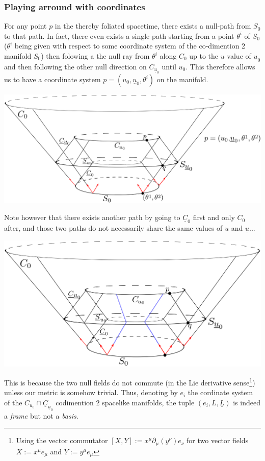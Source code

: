 \documentclass[a4paper,11pt]{article}
\numberwithin{equation}{section}
\theoremstyle{definition}
\begin{document}
\subsubsection{Playing arround with coordinates}
For any point $p$ in the thereby foliated spacetime, there exists a null-path from $S_0$ to that path. In fact, there even exists a single path starting from a point $\theta^i$ of $S_0$ ($\theta^i$ being given with respect to some coordinate system of the co-dimention 2 manifold $S_0$) then folowing a the null ray from $\theta^i$ along $C_0$ up to the $\underline{u}$ value of $\underline{u}_0$ and then following the other null direction on $C_{\underline{u}_0}$ until $u_0$. This therefore allows us to have a coordinate system $p=(u_0, \underline{u}_0, \theta^i)$ on the manifold.
\begin{center}
    \includegraphics [width=0.75\linewidth] {Pictures/04_Coordinates.png}
\end{center}

Note however that there exists another path by going to $\underline{C}_0$ first and only $C_0$ after, and those two paths do not necessarily share the same values of $u$ and $\underline{u}$... 
\begin{center}
    \includegraphics [width=0.75\linewidth] {Pictures/05_Torsion.png}
\end{center}

This is because the two null fields do not commute (in the Lie derivative sense\footnote{Using the vector commutator $[X,Y]:=x^\mu \partial_\mu (y^\nu) e_\nu$ for two vector fields $X:=x^\mu e_\mu$ and $Y:=y^\mu e_\mu$}) unless our metric is somehow trivial. Thus, denoting by $e_i$ the cordinate system of the $C_{u_0}\cap\underline{C}_{\underline{u}_0}$ codimention 2 spacelike manifolds, the tuple $(e_i, L, \underline{L})$ is indeed a \emph{frame} but not a \emph{basis}.
\end{document}
